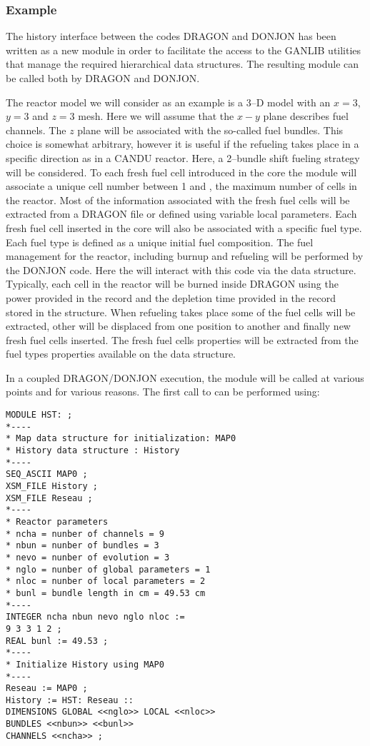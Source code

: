 \subsubsection{Example}\label{sect:HSTExample}

The history interface between the codes DRAGON and DONJON has been written as a new module in 
order to facilitate the access to the GANLIB utilities that manage the required hierarchical data structures. The 
resulting  module can be called both by DRAGON and DONJON.

The reactor model we will consider as an example is a 3--D model with an $x = 3$, $y = 3$ and $z = 3$ mesh. Here 
we will assume that the $x - y$ plane describes fuel channels. The $z$ plane will be associated with the so-called fuel 
bundles. This choice is somewhat arbitrary, however it is useful if the refueling takes place in a specific direction as 
in a CANDU reactor. Here, a 2--bundle shift fueling strategy will be considered. To each fresh fuel cell introduced 
in the core the  module will associate a unique cell number between 1 and , the maximum number of 
cells in the reactor. Most of the information associated with the fresh fuel cells will be extracted from a DRAGON 
 file or defined using variable local parameters. Each fresh fuel cell inserted in the core will also be 
associated with a specific fuel type. Each fuel type is defined as a unique initial fuel composition. 
The fuel management for the reactor, including burnup and refueling will be performed by the DONJON code. 
Here the  will interact with this code via the  data structure. Typically, each cell in the reactor will be 
burned inside DRAGON using the power provided in the  record and the depletion time provided in 
the  record stored in the  structure. When refueling takes place some of the 
fuel cells will be extracted, other will be displaced from one position to another and finally new fresh fuel cells 
inserted. The fresh fuel cells properties will be extracted from the fuel types properties available on the  
data structure.

In a coupled DRAGON/DONJON execution, the  module will be called at various points and for various 
reasons. The first call to  can be performed using:

\begin{verbatim}
MODULE HST: ; 
*---- 
* Map data structure for initialization: MAP0 
* History data structure : History 
*---- 
SEQ_ASCII MAP0 ; 
XSM_FILE History ; 
XSM_FILE Reseau ; 
*---- 
* Reactor parameters 
* ncha = nunber of channels = 9 
* nbun = nunber of bundles = 3 
* nevo = nunber of evolution = 3 
* nglo = nunber of global parameters = 1 
* nloc = nunber of local parameters = 2 
* bunl = bundle length in cm = 49.53 cm 
*---- 
INTEGER ncha nbun nevo nglo nloc := 
9 3 3 1 2 ; 
REAL bunl := 49.53 ; 
*---- 
* Initialize History using MAP0 
*---- 
Reseau := MAP0 ; 
History := HST: Reseau :: 
DIMENSIONS GLOBAL <<nglo>> LOCAL <<nloc>> 
BUNDLES <<nbun>> <<bunl>> 
CHANNELS <<ncha>> ;
\end{verbatim}

